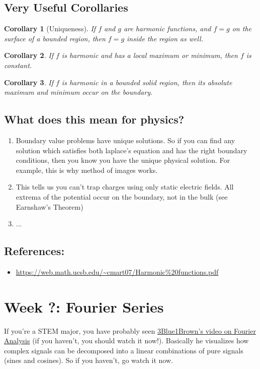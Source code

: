 \documentclass[12pt,fleqn]{article}
\numberwithin{equation}{section} %
\newtheorem{corollary}{Corollary}
\newcounter{problem}
\begin{document}
\subsection{Very Useful Corollaries}
\begin{corollary}[Uniqueness]
	If $f$ and $g$ are harmonic functions, and $f=g$ on the surface of a bounded region, then $f=g$ inside the region as well.
\end{corollary}
\begin{corollary}
	If $f$ is harmonic and has a local maximum or minimum, then $f$ is constant.
\end{corollary}
\begin{corollary}
	If $f$ is harmonic in a bounded solid region, then its absolute maximum and minimum occur on the boundary.
\end{corollary}


\subsection{What does this mean for physics?}
\begin{enumerate}
	\item Boundary value problems have unique solutions. So if you can find any solution which satisfies both laplace's equation and has the right boundary conditions, then you know you have the unique physical solution. For example, this is why method of images works.
	\item This tells us you can't trap charges using only static electric fields. All extrema of the potential occur on the boundary, not in the bulk (see Earnshaw's Theorem)
	\item ...
	
\end{enumerate}


\subsection{References:}
\begin{itemize}
	\item \url{https://web.math.ucsb.edu/~cmart07/Harmonic\%20functions.pdf}
\end{itemize}

\newpage
\section{Week ?: Fourier Series}
If you're a STEM major, you have probably seen \href{https://www.youtube.com/watch?v=spUNpyF58BY}
{3Blue1Brown's video on Fourier Analysis} (if you haven't, you should watch it now!). Basically he visualizes how complex signals can be decomposed into a linear combinations of pure signals (sines and cosines). So if you haven't, go watch it now.
\end{document}
